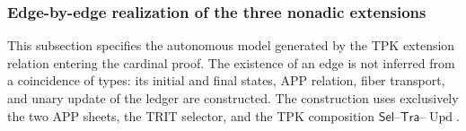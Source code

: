 \subsubsection{Edge-by-edge realization of the three nonadic extensions}
\label{hmtfg:subsubsec:tres-vueltas-ext-ch}

This subsection specifies the autonomous model generated by the TPK extension
relation entering the cardinal proof. The existence of an edge is not inferred
from a coincidence of types: its initial and final states, APP relation, fiber
transport, and unary update of the ledger are constructed. The construction
uses exclusively the two APP sheets, the TRIT selector, and the TPK
composition \(\mathsf{Sel}\)--\(\mathsf{Tra}\)--\(\operatorname{Upd}\).


